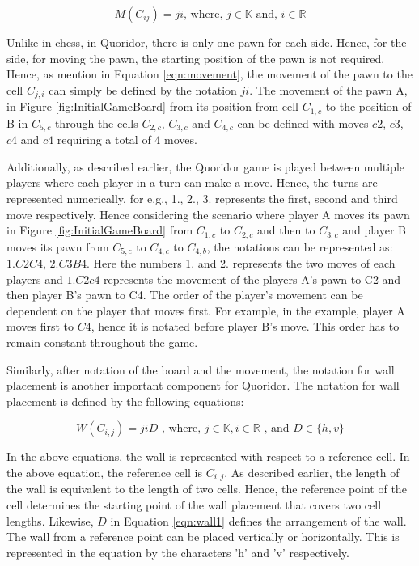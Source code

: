\begin{equation}\label{eqn:movement}
M(C_{ij}) = ji \text{, where, } j \in \mathbb{K} \text{ and, } i \in \mathbb{R}     
\end{equation}

Unlike in chess, in Quoridor, there is only one pawn for each side. Hence, for the side, for moving the pawn, the starting position of the pawn is not required. Hence, as mention in Equation \eqref{eqn:movement}, the movement of the pawn to the cell $C_{j, i}$ can simply be defined by the notation $ji$. The movement of the pawn A, in Figure \ref{fig:InitialGameBoard} from its position from cell $C_{1, c}$ to the position of B in $C_{5,c}$ through the cells $C_{2, c}$, $C_{3, c}$ and $C_{4, c}$ can be defined with moves $c2$, $c3$, $c4$ and $c4$ requiring a total of 4 moves.

Additionally, as described earlier, the Quoridor game is played between multiple players where each player in a turn can make a move. Hence, the turns are represented numerically, for e.g., 1., 2., 3. represents the first, second and third move respectively. Hence considering the scenario where player A moves its pawn in Figure \ref{fig:InitialGameBoard} from $C_{1,c}$ to $C_{2,c}$ and then to $C_{3,c}$ and player B moves its pawn from $C_{5,c}$ to $C_{4,c}$ to $C_{4,b}$, the notations can be represented as: $1. C2 C4$, $2. C3 B4$. Here the numbers 1. and 2. represents the two moves of each players and $1. C2 c4$ represents the movement of the players A's pawn to C2 and then player B's pawn to C4. The order of the player's movement can be dependent on the player that moves first. For example, in the example, player A moves first to $C4$, hence it is notated before player B's move. This order has to remain constant throughout the game.

Similarly, after notation of the board and the movement, the notation for wall placement is another important component for Quoridor. The notation for wall placement is defined by the following equations:

\begin{equation}\label{eqn:wall1}
W(C_{i,j}) = jiD \text{ , where, } j \in \mathbb{K}, i \in \mathbb{R}  \text{ , and } D \in \{h, v\}
\end{equation}

In the above equations, the wall is represented with respect to a reference cell. In the above equation, the reference cell is $C_{i, j}$. As described earlier, the length of the wall is equivalent to the length of two cells. Hence, the reference point of the cell determines the starting point of the wall placement that covers two cell lengths. Likewise, $D$ in Equation \eqref{eqn:wall1} defines the arrangement of the wall. The wall from a reference point can be placed vertically or horizontally. This is represented in the equation by the characters 'h' and 'v' respectively.

